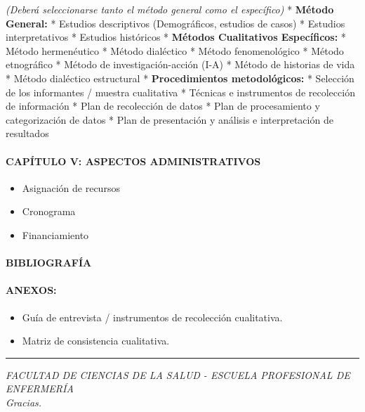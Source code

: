 ﻿\documentclass[12pt,a4paper]{article}
\begin{document}
\emph{(Deberá seleccionarse tanto el método general como el específico)} * \textbf{Método General:} * Estudios descriptivos (Demográficos, estudios de casos) * Estudios interpretativos * Estudios históricos * \textbf{Métodos Cualitativos Específicos:} * Método hermenéutico * Método dialéctico * Método fenomenológico * Método etnográfico * Método de investigación-acción (I-A) * Método de historias de vida * Método dialéctico estructural * \textbf{Procedimientos metodológicos:} * Selección de los informantes / muestra cualitativa * Técnicas e instrumentos de recolección de información * Plan de recolección de datos * Plan de procesamiento y categorización de datos * Plan de presentación y análisis e interpretación de resultados  \paragraph{CAPÍTULO V: ASPECTOS ADMINISTRATIVOS}\label{capuxedtulo-v-aspectos-administrativos}  \begin{itemize} \tightlist \item   Asignación de recursos \item   Cronograma \item   Financiamiento \end{itemize}  \paragraph{BIBLIOGRAFÍA}\label{bibliografuxeda}  \paragraph{ANEXOS:}\label{anexos-1}  \begin{itemize} \tightlist \item   Guía de entrevista / instrumentos de recolección cualitativa. \item   Matriz de consistencia cualitativa. \end{itemize}  \begin{center}\rule{0.5\linewidth}{0.5pt}\end{center}  \emph{FACULTAD DE CIENCIAS DE LA SALUD - ESCUELA PROFESIONAL DE ENFERMERÍA}\\ \emph{Gracias.}
\end{document}

